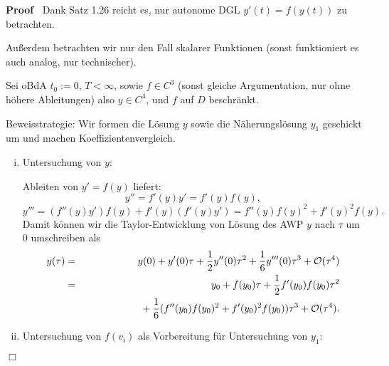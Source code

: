 \documentclass{book}
\newcommand{\assign}{:=}
\newenvironment{enumerateroman}{\begin{enumerate}[i.] }{\end{enumerate}}
\newenvironment{proof}{\noindent\textbf{Proof\ }}{\hspace*{\fill}$\Box$\medskip}
\begin{document}
\begin{proof}
  Dank Satz 1.26 reicht es, nur autonome DGL $y' (t) = f (y (t))$ zu
  betrachten.
  
  Au{\ss}erdem betrachten wir nur den Fall skalarer Funktionen (sonst
  funktioniert es auch analog, nur technischer).
  
  Sei oBdA $t_0 \assign 0$, $T < \infty$, sowie $f \in C^3$ (sonst gleiche
  Argumentation, nur ohne h{\"o}here Ableitungen) also $y \in C^4$, und $f$
  auf $D$ beschr{\"a}nkt.
  
  Beweisstrategie: Wir formen die L{\"o}sung $y$ sowie die
  N{\"a}herungsl{\"o}sung $y_1$ geschickt um und machen
  Koeffizientenvergleich.
  \begin{enumerateroman}
    \item Untersuchung von $y$:
    
    Ableiten von $y' = f (y)$ liefert:
    \[ y'' = f' (y) y' = f' (y) f (y), \]
    \[ y''' = (f'' (y) y') f (y) + f' (y) (f' (y) y') = f'' (y) f (y)^2 + f'
       (y)^2 f (y) . \]
    {\hspace{1.7em}}Damit k{\"o}nnen wir die Taylor-Entwicklung von L{\"o}sung
    des AWP $y$ nach $\tau$ um $0$ umschreiben als
    \begin{eqnarray*}
      y (\tau) & = & y (0) + y' (0) \tau + \frac{1}{2} y'' (0) \tau^2 +
      \frac{1}{6} y''' (0) \tau^3 +\mathcal{O} (\tau^4)\\
      & = & y_0 + f (y_0) \tau + \frac{1}{2} f' (y_0) f (y_0) \tau^2\\
      &  & \text{{\hspace{5.5em}}} + \frac{1}{6} (f'' (y_0) f (y_0)^2 + f'
      (y_0)^2 f (y_0)) \tau^3 +\mathcal{O} (\tau^4) .
    \end{eqnarray*}
    \item Untersuchung von $f (v_i)$ als Vorbereitung f{\"u}r Untersuchung von
    $y_1$:
    

\end{enumerateroman}
\end{proof}
\end{document}

